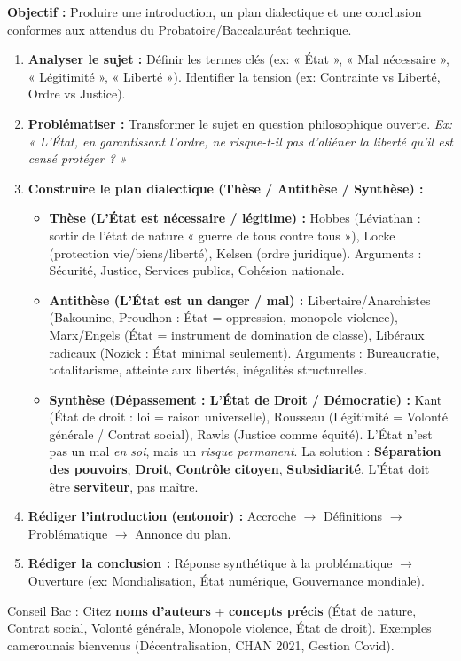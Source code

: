 \documentclass[11pt]{article}
\newcommand{\cle}[1]{{\popxbold\color{popdark}#1}}
\begin{document}
\begin{methode}
\textbf{Objectif :} Produire une introduction, un plan dialectique et une conclusion conformes aux attendus du Probatoire/Baccalauréat technique.
\begin{enumerate}
    \item \textbf{Analyser le sujet :} Définir les termes clés (ex: « État », « Mal nécessaire », « Légitimité », « Liberté »). Identifier la tension (ex: Contrainte vs Liberté, Ordre vs Justice).
    \item \textbf{Problématiser :} Transformer le sujet en question philosophique ouverte. \emph{Ex: « L'État, en garantissant l'ordre, ne risque-t-il pas d'aliéner la liberté qu'il est censé protéger ? »}
    \item \textbf{Construire le plan dialectique (Thèse / Antithèse / Synthèse) :}
    \begin{itemize}
        \item \textbf{Thèse (L'État est nécessaire / légitime) :} Hobbes (Léviathan : sortir de l'état de nature « guerre de tous contre tous »), Locke (protection vie/biens/liberté), Kelsen (ordre juridique). Arguments : Sécurité, Justice, Services publics, Cohésion nationale.
        \item \textbf{Antithèse (L'État est un danger / mal) :} Libertaire/Anarchistes (Bakounine, Proudhon : État = oppression, monopole violence), Marx/Engels (État = instrument de domination de classe), Libéraux radicaux (Nozick : État minimal seulement). Arguments : Bureaucratie, totalitarisme, atteinte aux libertés, inégalités structurelles.
        \item \textbf{Synthèse (Dépassement : L'État de Droit / Démocratie) :} Kant (État de droit : loi = raison universelle), Rousseau (Légitimité = Volonté générale / Contrat social), Rawls (Justice comme équité). L'État n'est pas un mal \emph{en soi}, mais un \emph{risque permanent}. La solution : \textbf{Séparation des pouvoirs}, \textbf{Droit}, \textbf{Contrôle citoyen}, \textbf{Subsidiarité}. L'État doit être \textbf{serviteur}, pas maître.
    \end{itemize}
    \item \textbf{Rédiger l'introduction (entonoir) :} Accroche $\rightarrow$ Définitions $\rightarrow$ Problématique $\rightarrow$ Annonce du plan.
    \item \textbf{Rédiger la conclusion :} Réponse synthétique à la problématique $\rightarrow$ Ouverture (ex: Mondialisation, État numérique, Gouvernance mondiale).
\end{enumerate}
\cle{Conseil Bac} : Citez \textbf{noms d'auteurs} + \textbf{concepts précis} (État de nature, Contrat social, Volonté générale, Monopole violence, État de droit). Exemples camerounais bienvenus (Décentralisation, CHAN 2021, Gestion Covid).
\end{methode}
\end{document}
